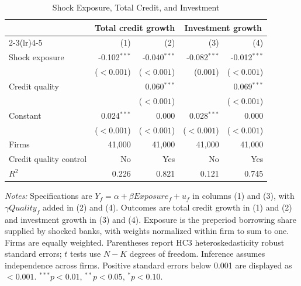 \begin{table}[H]
\centering
\caption{Shock Exposure, Total Credit, and Investment}
\label{tab:q4_firm_regressions}
\small
\renewcommand{\arraystretch}{1.10}
\begin{tabular*}{\linewidth}{@{\extracolsep{\fill}}lrrrr@{}}
\toprule
 & \multicolumn{2}{c}{Total credit growth} & \multicolumn{2}{c}{Investment growth} \\
\cmidrule(lr){2-3}\cmidrule(lr){4-5}
 & (1) & (2) & (3) & (4) \\
\midrule
Shock exposure & -0.102$^{***}$ & -0.040$^{***}$ & -0.082$^{***}$ & -0.012$^{***}$ \\
 & ($<0.001$) & ($<0.001$) & (0.001) & ($<0.001$) \\
Credit quality &  & 0.060$^{***}$ &  & 0.069$^{***}$ \\
 &  & ($<0.001$) &  & ($<0.001$) \\
Constant & 0.024$^{***}$ & 0.000 & 0.028$^{***}$ & 0.000 \\
 & ($<0.001$) & ($<0.001$) & ($<0.001$) & ($<0.001$) \\
\midrule
Firms & 41,000 & 41,000 & 41,000 & 41,000 \\
Credit quality control & No & Yes & No & Yes \\
$R^2$ & 0.226 & 0.821 & 0.121 & 0.745 \\
\bottomrule
\end{tabular*}
\par\smallskip
\begin{minipage}{\linewidth}\footnotesize
\textit{Notes:} Specifications are $Y_f=\alpha+\beta Exposure_f+u_f$ in columns (1) and (3), with $\gamma Quality_f$ added in (2) and (4). Outcomes are total credit growth in (1) and (2) and investment growth in (3) and (4). Exposure is the preperiod borrowing share supplied by shocked banks, with weights normalized within firm to sum to one. Firms are equally weighted. Parentheses report HC3 heteroskedasticity robust standard errors; $t$ tests use $N-K$ degrees of freedom. Inference assumes independence across firms. Positive standard errors below 0.001 are displayed as $<0.001$. $^{***}p<0.01$, $^{**}p<0.05$, $^{*}p<0.10$.
\end{minipage}
\end{table}
